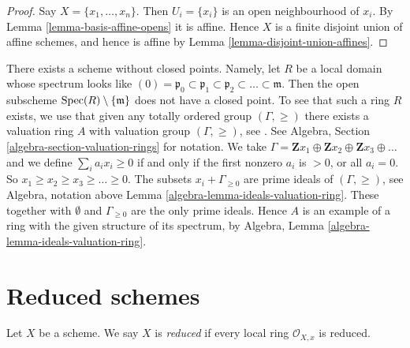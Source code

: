 \begin{proof}
Say $X = \{x_1, \ldots, x_n\}$. Then $U_i = \{x_i\}$ is an open neighbourhood
of $x_i$. By
Lemma \ref{lemma-basis-affine-opens}
it is affine. Hence $X$ is a finite disjoint union of affine schemes, and
hence is affine by
Lemma \ref{lemma-disjoint-union-affines}.
\end{proof}

\begin{example}
\label{example-scheme-without-closed-points}
There exists a scheme without closed points.
Namely, let $R$ be a local domain whose spectrum
looks like
$(0) = \mathfrak p_0 \subset \mathfrak p_1 \subset \mathfrak p_2
\subset \ldots \subset \mathfrak m$. Then the open subscheme
$\mathop{\rm Spec}(R) \setminus \{\mathfrak m\}$ does not have
a closed point. To see that such a ring $R$ exists, we use
that given any totally ordered group $(\Gamma, \geq)$
there exists a valuation ring $A$ with valuation group $(\Gamma, \geq)$,
see \cite{Krull}. See Algebra, Section \ref{algebra-section-valuation-rings}
for notation. We take
$\Gamma = \mathbf{Z}x_1 \oplus \mathbf{Z}x_2 \oplus \mathbf{Z}x_3 \oplus
\ldots$ and we define $\sum_i a_i x_i \geq 0$ if and only
if the first nonzero $a_i$ is $> 0$, or all $a_i = 0$.
So $x_1 \geq x_2 \geq x_3 \geq  \ldots \geq 0$.
The subsets $x_i + \Gamma_{\geq 0}$ are prime ideals
of $(\Gamma, \geq)$, see Algebra, notation above
Lemma \ref{algebra-lemma-ideals-valuation-ring}. These together
with $\emptyset$ and $\Gamma_{\geq 0}$ are the only prime ideals.
Hence $A$ is an example of a ring with the given structure of
its spectrum, by
Algebra, Lemma \ref{algebra-lemma-ideals-valuation-ring}.
\end{example}



















\section{Reduced schemes}
\label{section-reduced}

\begin{definition}
\label{definition-reduced}
Let $X$ be a scheme. We say $X$ is {\it reduced} if every local ring
$\mathcal{O}_{X, x}$ is reduced.
\end{definition}

